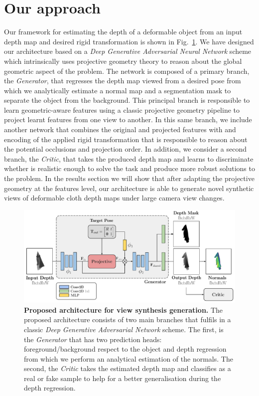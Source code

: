 \section{Our approach}
Our framework for estimating the depth of a deformable object from an input depth map and desired rigid transformation is shown in Fig.~\ref{fig_architecture}. We have designed our architecture based on a \textit{Deep Generative Adversarial Neural Network} scheme which intrinsically uses projective geometry theory to reason about the global geometric aspect of the problem. The network is composed of a primary branch, the \textit{Generator}, that regresses the depth map viewed from   a desired pose from which we analytically estimate a normal map and a segmentation mask to separate the object from the background. This principal branch is responsible to learn geometric-aware features using a classic projective geometry pipeline to project learnt features from one view to another. In this same branch, we include another network that combines the original and projected features with and encoding of the applied rigid transformation that is responsible to reason about the potential occlusions and projection order. In addition, we consider a second branch, the \textit{Critic}, that takes the produced depth map and learns to discriminate whether is realistic enough to solve the task and produce more robust solutions to the problem. In the results section we will show that after adapting the projective geometry at the features level, our architecture is able to generate novel synthetic views of deformable cloth depth maps under large camera view changes.


\begin{figure}[!t]
    \centering
    \includegraphics[width=\textwidth]{main/chapter04/data/ipalm_cvpr_architecture.pdf}
    \caption[Proposed architecture for view synthesis generation]{\textbf{Proposed architecture for view synthesis generation.} The proposed architecture consists of two main branches that fulfils in a classic \textit{Deep Generative Adversarial Network} scheme. The first, is the \textit{Generator} that has two prediction heads: foreground/background respect to the object and depth regression from which we perform an analytical estimation of the normals. The second, the \textit{Critic} takes the estimated depth map and classifies as a real or fake sample to help for a better generalisation during the depth regression.}
    \label{fig_architecture}
\end{figure}

